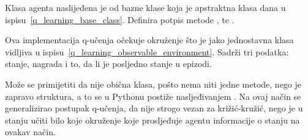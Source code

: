 
Klasa agenta naslijeđena je od bazne klase  koja je apstraktna klasa dana u ispisu~\ref{q_learning_base_class}. Definira potpis metode ,  te . 

Ova implementacija q-učenja očekuje okruženje  što je jako jednostavna klasa vidljiva u ispisu~\ref{q_learning_observable_environment}. Sadrži tri podatka: stanje, nagrada i to, da li je posljedno stanje u epizodi.


Može se primijetiti da nije obična klasa, pošto nema niti jedne metode, nego je zapravo struktura, a to se u Pythonu postiže nasljeđivanjem . Na ovaj način se generalizirao postupak q-učenja, da nije strogo vezan za križić-kružić, nego je u stanju učiti bilo koje okruženje koje prosljeđuje agentu informacije o stanju na ovakav način.

